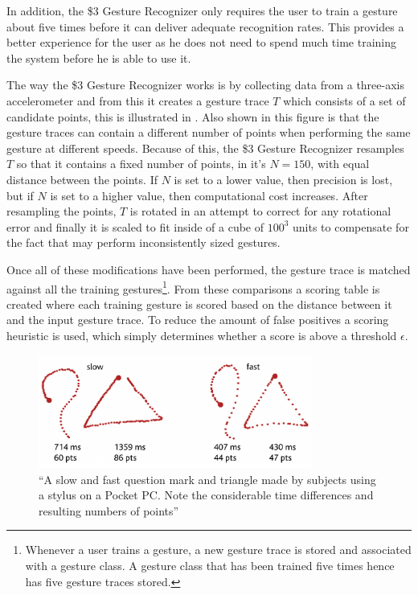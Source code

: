 In addition, the \$3 Gesture Recognizer only requires the user to train a gesture about five times before it can deliver adequate recognition rates. This provides a better experience for the user as he does not need to spend much time training the system before he is able to use it.

The way the \$3 Gesture Recognizer works is by collecting data from a three-axis accelerometer and from this it creates a gesture trace $T$ which consists of a set of candidate points, this is illustrated in .
Also shown in this figure is that the gesture traces can contain a different number of points when performing the same gesture at different speeds.
Because of this, the \$3 Gesture Recognizer resamples $T$ so that it contains a fixed number of points, in \cite{threedollar} it's $N = 150$, with equal distance between the points.
If $N$ is set to a lower value, then precision is lost, but if $N$ is set to a higher value, then computational cost increases.
After resampling the points, $T$ is rotated in an attempt to correct for any rotational error and finally it is scaled to fit inside of a cube of $100^3$ units to compensate for the fact that may perform inconsistently sized gestures.

Once all of these modifications have been performed, the gesture trace is matched against all the training gestures\footnote{Whenever a user trains a gesture, a new gesture trace is stored and associated with a gesture class. A gesture class that has been trained five times hence has five gesture traces stored.}.
From these comparisons a scoring table is created where each training gesture is scored based on the distance between it and the input gesture trace. To reduce the amount of false positives a scoring heuristic is used, which simply determines whether a score is above a threshold $\epsilon$.

\begin{figure}[!htb]
  \centering
  \includegraphics[width=0.8\textwidth]{images/1-dollar-gesturetrace.png}
  \caption[Some Caption]{``A slow and fast question mark and triangle made by
subjects using a stylus on a Pocket PC. Note the considerable time
differences and resulting numbers of points''\footnotemark}
\label{fig:onedollar-gesturetrace}
\end{figure}

